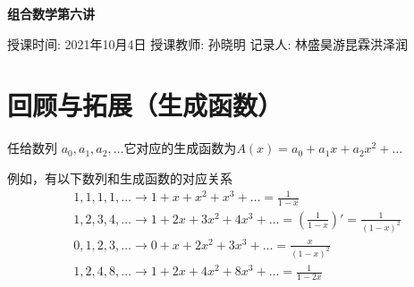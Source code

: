 \documentclass[11pt]{article}
\begin{document}
    \pagestyle{fancy}
    \chead{}

    \begin{center}
        {\LARGE \bf 组合数学第六讲}\\
    \end{center}
        \begin{kaishu}
            授课时间: 2021年10月4日\quad
            授课教师: 孙晓明
            \hfill 记录人: 林盛昊\quad 游昆霖\quad 洪泽润
        \end{kaishu}
        
\section{回顾与拓展（生成函数）} 
    任给数列 $a_0,a_1,a_2,\ldots$它对应的生成函数为$A(x)=a_0+a_1x+a_2x^2+\ldots$\par 
    例如，有以下数列和生成函数的对应关系
\begin{align*}
    &1,1,1,1,\ldots  \rightarrow 1+x+x^2+x^3+\ldots=\frac{1}{1-x}\\
    &1,2,3,4,\ldots\rightarrow 1+2x+3x^2+4x^3+\ldots=(\frac{1}{1-x})'=\frac{1}{{(1-x)}^2}\\
    &0,1,2,3,\ldots\rightarrow 0+x+2x^2+3x^3+\ldots=\frac{x}{{(1-x)}^2}\\
    &1,2,4,8,\ldots\rightarrow 1+2x+4x^2+8x^3+\ldots=\frac{1}{1-2x}
\end{align*}    
\end{document}

